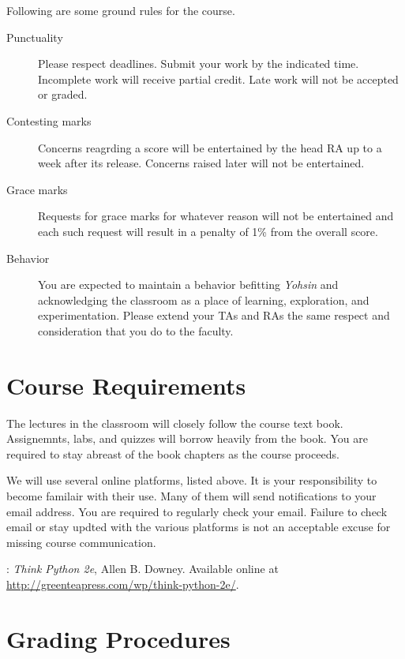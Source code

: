 \documentclass[a4paper]{article}
\begin{document}
Following are some ground rules for the course.
\begin{description}
\item[Punctuality] Please respect deadlines. Submit your work by the indicated time. Incomplete work will receive partial credit. Late work will not be accepted or graded.
\item[Contesting marks] Concerns reagrding a score will be entertained by the head RA up to a week after its release. Concerns raised later will not be entertained.
\item[Grace marks] Requests for grace marks for whatever reason will not be entertained and each such request will result in a penalty of 1\% from the overall score.
\item[Behavior] You are expected to maintain a behavior befitting {\it Yohsin} and acknowledging the classroom as a place of learning, exploration, and experimentation. Please extend your TAs and RAs the same respect and consideration that you do to the faculty.
\end{description}

\section{Course Requirements}


The lectures in the classroom will closely follow the course text book. Assignemnts, labs, and quizzes will borrow heavily from the book. You are required to stay abreast of the book chapters as the course proceeds.

We will use several online platforms, listed above. It is your responsibility to become familair with their use. Many of them will send notifications to your email address. You are required to regularly check your email. Failure to check email or stay updted with the various platforms is not an acceptable excuse for missing course communication.

: {\it Think Python 2e}, Allen B. Downey. Available online at \url{http://greenteapress.com/wp/think-python-2e/}.

\section{Grading Procedures}
\label{sec:grade}
\end{document}
